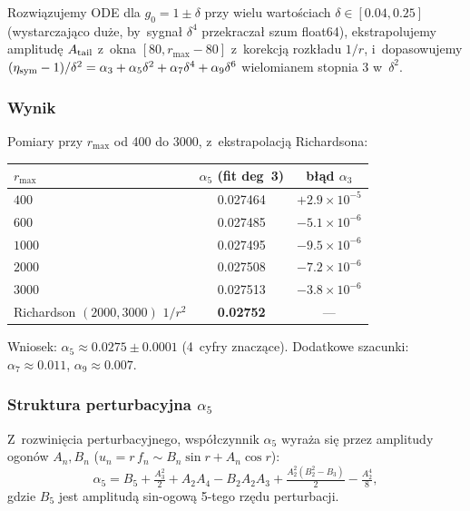 Rozwi\k{a}zujemy ODE dla $g_0 = 1 \pm \delta$ przy wielu warto\'sciach
$\delta \in [0.04, 0.25]$ (wystarczaj\k{a}co du\.ze, by~sygna\l{} $\delta^4$
przekracza\l{} szum float64), ekstrapolujemy amplitud\k{e} $A_{\rm tail}$
z~okna $[80, r_{\max}-80]$ z~korekcj\k{a} rozk\l{}adu $1/r$, i~dopasowujemy
$(\eta_{\rm sym} - 1)/\delta^2 = \alpha_3 + \alpha_5 \delta^2 + \alpha_7 \delta^4 + \alpha_9 \delta^6$
wielomianem stopnia 3 w~$\delta^2$.

\subsubsection*{Wynik}

Pomiary przy $r_{\max}$ od 400 do 3000, z~ekstrapolacj\k{a} Richardsona:
\begin{center}
\begin{tabular}{lcc}
\hline
$r_{\max}$ & $\alpha_5$ (fit deg~3) & b\l{}\k{a}d $\alpha_3$ \\
\hline
$400$  & 0.027464 & $+2.9 \times 10^{-5}$ \\
$600$  & 0.027485 & $-5.1 \times 10^{-6}$ \\
$1000$ & 0.027495 & $-9.5 \times 10^{-6}$ \\
$2000$ & 0.027508 & $-7.2 \times 10^{-6}$ \\
$3000$ & 0.027513 & $-3.8 \times 10^{-6}$ \\
\hline
Richardson $(2000,3000)$ $1/r^2$ & \textbf{0.02752} & --- \\
\hline
\end{tabular}
\end{center}
Wniosek: $\alpha_5 \approx 0.0275 \pm 0.0001$ (4~cyfry znacz\k{a}ce).
Dodatkowe szacunki: $\alpha_7 \approx 0.011$, $\alpha_9 \approx 0.007$.

\subsubsection*{Struktura perturbacyjna $\alpha_5$}

Z~rozwini\k{e}cia perturbacyjnego, wsp\'o\l{}czynnik $\alpha_5$
wyra\.za si\k{e} przez amplitudy ogon\'ow $A_n, B_n$ ($u_n = r\,f_n \sim B_n\sin r + A_n\cos r$):
\begin{equation}
  \alpha_5 = B_5 + \tfrac{A_3^2}{2} + A_2 A_4 - B_2 A_2 A_3 + \tfrac{A_2^2(B_2^2 - B_3)}{2} - \tfrac{A_2^4}{8},
\end{equation}
gdzie $B_5$ jest amplitud\k{a} sin-ogow\k{a} 5-tego rz\k{e}du perturbacji.


